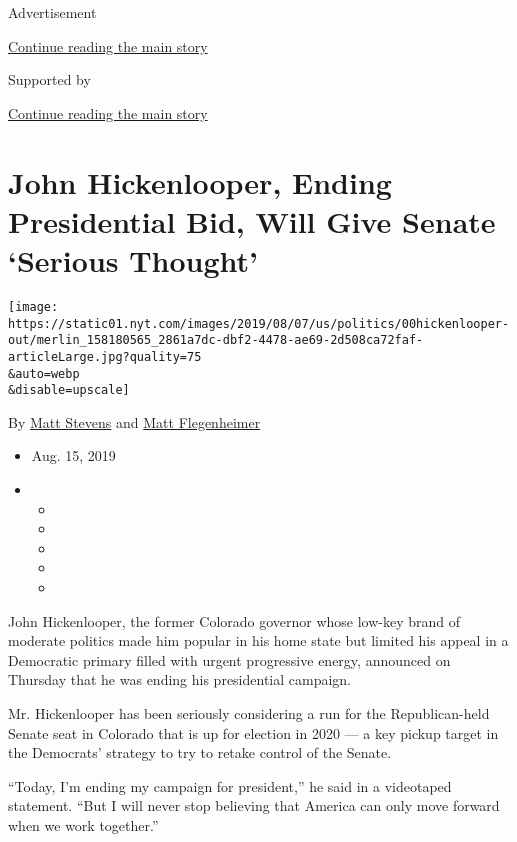 Advertisement

\protect\hyperlink{after-top}{Continue reading the main story}

Supported by

\protect\hyperlink{after-sponsor}{Continue reading the main story}

\hypertarget{john-hickenlooper-ending-presidential-bid-will-give-senate-serious-thought}{%
\section{John Hickenlooper, Ending Presidential Bid, Will Give Senate
`Serious
Thought'}\label{john-hickenlooper-ending-presidential-bid-will-give-senate-serious-thought}}

\texttt{[image: https://static01.nyt.com/images/2019/08/07/us/politics/00hickenlooper-out/merlin\_158180565\_2861a7dc-dbf2-4478-ae69-2d508ca72faf-articleLarge.jpg?quality=75\\\&auto=webp\\\&disable=upscale]}

By \href{https://www.nytimes.com/by/matt-stevens}{Matt Stevens} and
\href{https://www.nytimes.com/by/matt-flegenheimer}{Matt Flegenheimer}

\begin{itemize}
\item
  Aug. 15, 2019
\item
  \begin{itemize}
  \item
  \item
  \item
  \item
  \item
  \end{itemize}
\end{itemize}

John Hickenlooper, the former Colorado governor whose low-key brand of
moderate politics made him popular in his home state but limited his
appeal in a Democratic primary filled with urgent progressive energy,
announced on Thursday that he was ending his presidential campaign.

Mr. Hickenlooper has been seriously considering a run for the
Republican-held Senate seat in Colorado that is up for election in 2020
--- a key pickup target in the Democrats' strategy to try to retake
control of the Senate.

``Today, I'm ending my campaign for president,'' he said in a videotaped
statement. ``But I will never stop believing that America can only move
forward when we work together.''

